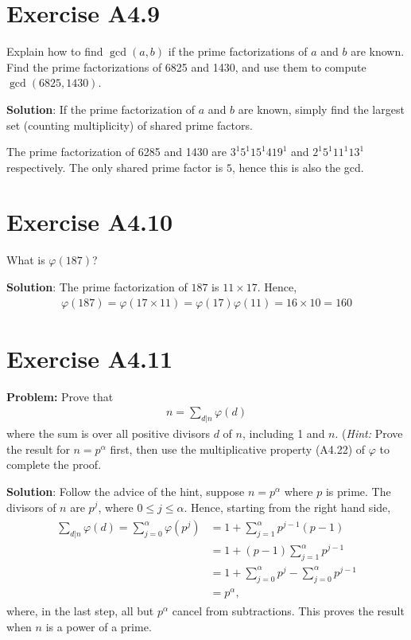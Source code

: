 \documentclass{book}
\begin{document}
\section*{Exercise A4.9}
    Explain how to find $\gcd(a,b)$ if the prime factorizations of $a$ and $b$ are known. Find the prime factorizations of 6825 and 1430, and use them to compute $\gcd(6825,1430)$.
    
    \textbf{Solution}: If the prime factorization of $a$ and $b$ are known, simply find the largest set (counting multiplicity) of shared prime factors. 

    The prime factorization of 6285 and 1430 are $3^1 5^1 15^1 419^1$ and $2^1 5^1 11^1 13^1$ respectively. The only shared prime factor is $5$, hence this is also the gcd.

\section*{Exercise A4.10}
    What is $\varphi(187)$?
    
    \textbf{Solution}: The prime factorization of $187$ is $11\times17$. Hence,
    \begin{align}
        \varphi(187) = \varphi(17\times 11) = \varphi(17)\varphi(11) = 16 \times 10 = 160
    \end{align}

\section*{Exercise A4.11}
    \textbf{Problem:} Prove that
    \begin{align}
        n = \sum_{d|n} \varphi(d)
    \end{align}
    where the sum is over all positive divisors $d$ of $n$, including 1 and $n$. (\emph{Hint:} Prove the result for $n=p^\alpha$ first, then use the multiplicative property (A4.22) of $\varphi$ to complete the proof.

    \textbf{Solution}: Follow the advice of the hint, suppose $n=p^\alpha$ where $p$ is prime. The divisors of $n$ are $p^j$, where $0\leq j \leq \alpha$. Hence, starting from the right hand side,
    \begin{align}
    \begin{aligned}
        \sum_{d|n} \varphi(d) = \sum_{j=0}^\alpha \varphi(p^j) &=1 +  \sum_{j=1}^\alpha p^{j-1}(p-1)\\
        &= 1+ (p-1)\sum_{j=1}^\alpha p^{j-1} \\
        &= 1 + \sum_{j=0}^\alpha p^j -\sum_{j=0}^\alpha p^{j-1} \\
        &= p^\alpha,
    \end{aligned}
    \end{align}
    where, in the last step, all but $p^\alpha$ cancel from subtractions. This proves the result when $n$ is a power of a prime.
    
\end{document}
